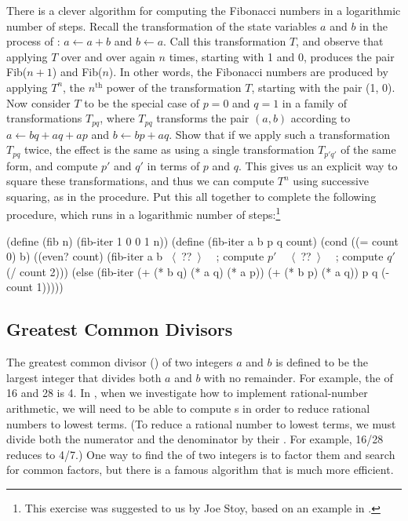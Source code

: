 \begin{exerciseGroup}
\label{Exercise 1.19}
 There is a clever algorithm for
computing the Fibonacci numbers in a logarithmic number of steps.  Recall the
transformation of the state variables \( a \) and \( b \) in the 
process of : \( a \gets a + b \) and \( b \gets a \).
Call this transformation \( T \), and observe that applying \( T \) over and over
again \( n \) times, starting with 1 and 0, produces the pair Fib(\( n+1 \)) and
Fib(\( n \)).  In other words, the Fibonacci numbers are produced
by applying \( T^n \), the \( n^{\mathrm{th}} \) power of the transformation \( T \),
starting with the pair (1, 0).  Now consider \( T \) to be the special case of
\( p=0 \) and \( q=1 \) in a family of transformations \( T_{pq} \),
where \( T_{pq} \) transforms the pair \( (a, b) \) according to
\( a \gets bq + aq + ap \) and \( b \gets bp + aq \).
Show that if we apply such a transformation \( T_{pq} \) twice, the
effect is the same as using a single transformation \( T_{p'\!q'} \) of the
same form, and compute \( p'\! \) and \( q'\! \) in terms of \( p \) and \( q \).  This
gives us an explicit way to square these transformations, and thus we can
compute \( T^n \) using successive squaring, as in the 
procedure.  Put this all together to complete the following procedure, which
runs in a logarithmic number of steps:\footnote{This exercise was suggested to
us by Joe Stoy, based on an example in .}

\begin{codeBlock}
(define (fib n)
  (fib-iter 1 0 0 1 n))
(define (fib-iter a b p q count)
  (cond ((= count 0) b)
        ((even? count)
         (fib-iter a
                   b
                   ~\(\langle \)~??~\(\rangle \)~   ~\textrm{; compute \( p' \)}~
                   ~\(\langle \)~??~\(\rangle \)~   ~\textrm{; compute \( q' \)}~
                   (/ count 2)))
        (else (fib-iter (+ (* b q) (* a q) (* a p))
                        (+ (* b p) (* a q))
                        p
                        q
                        (- count 1)))))
\end{codeBlock}
\end{exerciseGroup}

\subsection{Greatest Common Divisors}
\label{Section 1.2.5}

The greatest common divisor () of two integers \( a \) and \( b \) is
defined to be the largest integer that divides both \( a \) and \( b \) with no
remainder.  For example, the  of 16 and 28 is 4.  In , when we investigate how to implement rational-number arithmetic, we will
need to be able to compute s in order to reduce rational numbers
to lowest terms.  (To reduce a rational number to lowest terms, we must divide
both the numerator and the denominator by their .  For example,
16/28 reduces to 4/7.)  One way to find the  of two integers is to
factor them and search for common factors, but there is a famous algorithm that
is much more efficient.

